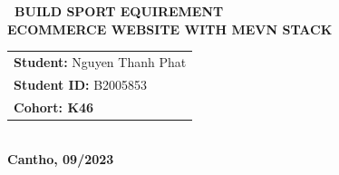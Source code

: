 \begin{titlepage}
\begin{center}
        \textbf{{\Large\ BUILD  SPORT EQUIREMENT\\ ECOMMERCE WEBSITE WITH MEVN STACK}}
        \\[3.5cm]

        \begin{tabular}{ l l }
            \multicolumn{2}{l}{\textbf{Student:} Nguyen Thanh Phat  } \\
            \multicolumn{2}{l}{\textbf{Student ID:} B2005853}         \\
            \multicolumn{2}{l}{\textbf{Cohort: K46}}                  \\
        \end{tabular}
        \\[4.5cm]

        \textbf{Cantho, 09/2023}

    \end{center}

\end{titlepage}
